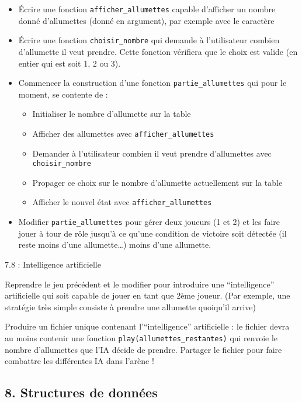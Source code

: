 \documentclass[]{article}
\providecommand{\tightlist}{%
  \setlength{\itemsep}{0pt}\setlength{\parskip}{0pt}}
\begin{document}
\begin{itemize}
\tightlist
\item
  Écrire une fonction \texttt{afficher\_allumettes} capable d'afficher
  un nombre donné d'allumettes (donné en argument), par exemple avec le
  caractère \texttt{\textbar{}}
\item
  Écrire une fonction \texttt{choisir\_nombre} qui demande à
  l'utilisateur combien d'allumette il veut prendre. Cette fonction
  vérifiera que le choix est valide (en entier qui est soit 1, 2 ou 3).
\item
  Commencer la construction d'une fonction \texttt{partie\_allumettes}
  qui pour le moment, se contente de :

  \begin{itemize}
  \tightlist
  \item
    Initialiser le nombre d'allumette sur la table
  \item
    Afficher des allumettes avec \texttt{afficher\_allumettes}
  \item
    Demander à l'utilisateur combien il veut prendre d'allumettes avec
    \texttt{choisir\_nombre}
  \item
    Propager ce choix sur le nombre d'allumette actuellement sur la
    table
  \item
    Afficher le nouvel état avec \texttt{afficher\_allumettes}
  \end{itemize}
\item
  Modifier \texttt{partie\_allumettes} pour gérer deux joueurs (1 et 2)
  et les faire jouer à tour de rôle jusqu'à ce qu'une condition de
  victoire soit détectée (il reste moins d'une allumette\ldots{}) moins
  d'une allumette.
\end{itemize}

7.8 : Intelligence artificielle

Reprendre le jeu précédent et le modifier pour introduire une
``intelligence'' artificielle qui soit capable de jouer en tant que 2ème
joueur. (Par exemple, une stratégie très simple consiste à prendre une
allumette quoiqu'il arrive)

Produire un fichier unique contenant l'``intelligence'' artificielle :
le fichier devra au moins contenir une fonction
\texttt{play(allumettes\_restantes)} qui renvoie le nombre d'allumettes
que l'IA décide de prendre. Partager le fichier pour faire combattre les
différentes IA dans l'arène !

\hypertarget{structures-de-donnuxe9es}{%
\subsection{8. Structures de données}\label{structures-de-donnuxe9es}}
\end{document}
